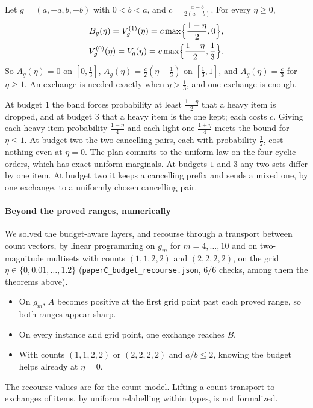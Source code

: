\begin{theorem}
\label{thm:fourrecourse}
Let $g=(a,-a,b,-b)$ with $0<b<a$, and $c=\frac{a-b}{2(a+b)}$. For every $\eta\ge0$,
\begin{gather*}
B_{g}(\eta)=V^{(1)}_{g}(\eta)=c\max\Bigl\{\frac{1-\eta}2,0\Bigr\},\\
V^{(0)}_{g}(\eta)=V_{g}(\eta)=c\max\Bigl\{\frac{1-\eta}2,\frac13\Bigr\}.
\end{gather*}
So $A_{g}(\eta)=0$ on $[0,\frac13]$, $A_g(\eta)=\frac c2(\eta-\frac13)$ on $[\frac13,1]$, and
$A_g(\eta)=\frac c3$ for $\eta\ge1$. An exchange is needed exactly when $\eta>\frac13$, and one
exchange is enough.
\end{theorem}

At budget $1$ the band forces probability at least $\frac{1-\eta}2$ that a heavy item is dropped,
and at budget $3$ that a heavy item is the one kept; each costs $c$. Giving each heavy item
probability $\frac{1-\eta}4$ and each light one $\frac{1+\eta}4$ meets the bound for $\eta\le1$. At budget two
the two cancelling pairs, each with probability $\frac12$, cost nothing even at $\eta=0$. The
plan commits to the uniform law on the four cyclic orders, which has exact uniform marginals.
At budgets $1$ and $3$ any two sets differ by one item. At budget two it keeps a cancelling
prefix and sends a mixed one, by one exchange, to a uniformly chosen cancelling pair.

\paragraph{Beyond the proved ranges, numerically} \NUM{} We solved the budget-aware layers, and
recourse through a transport between count vectors, by linear programming on $g_m$ for
$m=4,\dots,10$ and on two-magnitude multisets with counts $(1,1,2,2)$ and $(2,2,2,2)$, on the
grid $\eta\in\{0,0.01,\dots,1.2\}$ (\texttt{paperC\_budget\_recourse.json}, $6/6$ checks, among them the theorems above).
\begin{itemize}
\item On $g_m$, $A$ becomes positive at the first grid point past each proved range, so both
ranges appear sharp.
\item On every instance and grid point, one exchange reaches $B$.
\item With counts $(1,1,2,2)$ or $(2,2,2,2)$ and $a/b\le2$, knowing the budget helps already at
$\eta=0$.
\end{itemize}
The recourse values are for the count model. Lifting a count transport to exchanges of items,
by uniform relabelling within types, is not formalized.


